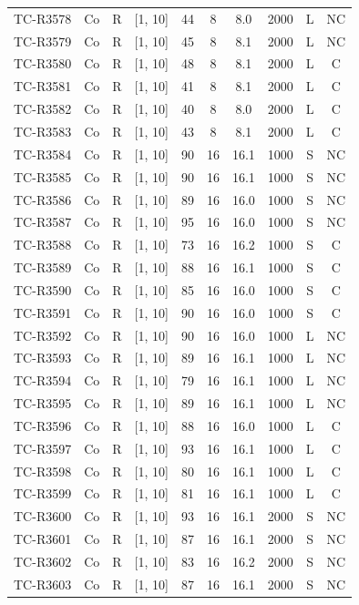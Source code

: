 \begin{longtable}{lccccccccc}
TC-R3578 & Co & R & [1, 10] & 44 & 8 & 8.0 & 2000 & L & NC \\
TC-R3579 & Co & R & [1, 10] & 45 & 8 & 8.1 & 2000 & L & NC \\
TC-R3580 & Co & R & [1, 10] & 48 & 8 & 8.1 & 2000 & L & C \\
TC-R3581 & Co & R & [1, 10] & 41 & 8 & 8.1 & 2000 & L & C \\
TC-R3582 & Co & R & [1, 10] & 40 & 8 & 8.0 & 2000 & L & C \\
TC-R3583 & Co & R & [1, 10] & 43 & 8 & 8.1 & 2000 & L & C \\
TC-R3584 & Co & R & [1, 10] & 90 & 16 & 16.1 & 1000 & S & NC \\
TC-R3585 & Co & R & [1, 10] & 90 & 16 & 16.1 & 1000 & S & NC \\
TC-R3586 & Co & R & [1, 10] & 89 & 16 & 16.0 & 1000 & S & NC \\
TC-R3587 & Co & R & [1, 10] & 95 & 16 & 16.0 & 1000 & S & NC \\
TC-R3588 & Co & R & [1, 10] & 73 & 16 & 16.2 & 1000 & S & C \\
TC-R3589 & Co & R & [1, 10] & 88 & 16 & 16.1 & 1000 & S & C \\
TC-R3590 & Co & R & [1, 10] & 85 & 16 & 16.0 & 1000 & S & C \\
TC-R3591 & Co & R & [1, 10] & 90 & 16 & 16.0 & 1000 & S & C \\
TC-R3592 & Co & R & [1, 10] & 90 & 16 & 16.0 & 1000 & L & NC \\
TC-R3593 & Co & R & [1, 10] & 89 & 16 & 16.1 & 1000 & L & NC \\
TC-R3594 & Co & R & [1, 10] & 79 & 16 & 16.1 & 1000 & L & NC \\
TC-R3595 & Co & R & [1, 10] & 89 & 16 & 16.1 & 1000 & L & NC \\
TC-R3596 & Co & R & [1, 10] & 88 & 16 & 16.0 & 1000 & L & C \\
TC-R3597 & Co & R & [1, 10] & 93 & 16 & 16.1 & 1000 & L & C \\
TC-R3598 & Co & R & [1, 10] & 80 & 16 & 16.1 & 1000 & L & C \\
TC-R3599 & Co & R & [1, 10] & 81 & 16 & 16.1 & 1000 & L & C \\
TC-R3600 & Co & R & [1, 10] & 93 & 16 & 16.1 & 2000 & S & NC \\
TC-R3601 & Co & R & [1, 10] & 87 & 16 & 16.1 & 2000 & S & NC \\
TC-R3602 & Co & R & [1, 10] & 83 & 16 & 16.2 & 2000 & S & NC \\
TC-R3603 & Co & R & [1, 10] & 87 & 16 & 16.1 & 2000 & S & NC \\

\end{longtable}

